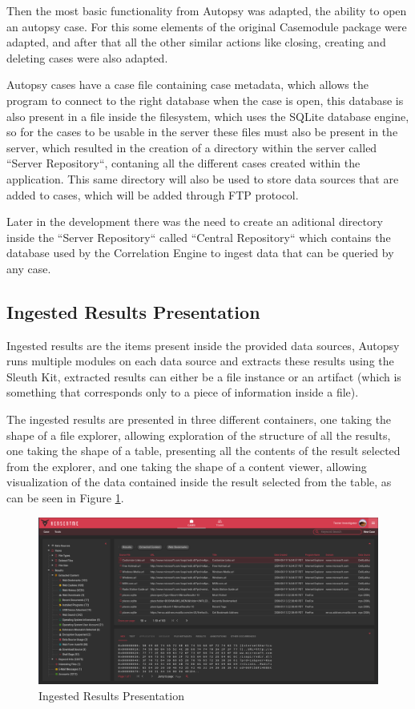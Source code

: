 Then the most basic functionality from Autopsy was adapted, the ability to open an autopsy case. For this some elements of the original Casemodule package were adapted,
and after that all the other similar actions like closing, creating and deleting cases were also adapted.

Autopsy cases have a case file containing case metadata, which allows the program to connect to the right database when the case is open, this database is also present
in a file inside the filesystem, which uses the SQLite database engine, so for the cases to be usable in the server these files must also be present in the server,
which resulted in the creation of a directory within the server called ``Server Repository``, contaning all the different cases created within the application.
This same directory will also be used to store data sources that are added to cases, which will be added through FTP protocol.

Later in the development there was the need to create an aditional directory inside the ``Server Repository`` called ``Central Repository``
which contains the database used by the Correlation Engine to ingest data that can be queried by any case.

\subsection{Ingested Results Presentation}

Ingested results are the items present inside the provided data sources, Autopsy runs multiple modules on each data source and extracts these results using the Sleuth Kit,
extracted results can either be a file instance or an artifact (which is something that corresponds only to a piece of information inside a file).

The ingested results are presented in three different containers, one taking the shape of a file explorer, allowing exploration of the structure of all the results, 
one taking the shape of a table, presenting all the contents of the result selected from the explorer, and one taking the shape of a content viewer, allowing visualization
of the data contained inside the result selected from the table, as can be seen in Figure \ref{fig:data}.

\begin{figure}[h]
 \centering
 \includegraphics[width=1\linewidth]{imgs/data.png}
 \caption{Ingested Results Presentation}
 \label{fig:data}
\end{figure}

